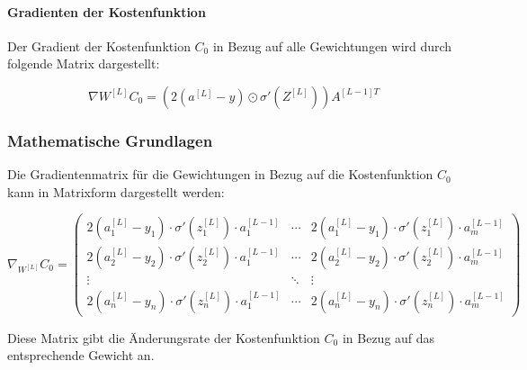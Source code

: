 \paragraph{Gradienten der Kostenfunktion}

Der Gradient der Kostenfunktion \( C_0 \) in Bezug auf alle Gewichtungen wird durch folgende Matrix dargestellt:

\[
\nabla W^{[L]} C_0 = \left( 2 \left( a^{[L]} - y \right) \odot \sigma' \left( Z^{[L]} \right) \right) A^{[L-1]T}
\]

\subsubsection{Mathematische Grundlagen}

Die Gradientenmatrix für die Gewichtungen in Bezug auf die Kostenfunktion \( C_0 \) kann in Matrixform dargestellt werden:

\[
\nabla_{W^{[L]}} C_0 = 
\begin{pmatrix}
2(a_1^{[L]} - y_1) \cdot \sigma' (z_1^{[L]}) \cdot a_1^{[L-1]} & \cdots & 2(a_1^{[L]} - y_1) \cdot \sigma' (z_1^{[L]}) \cdot a_m^{[L-1]} \\
2(a_2^{[L]} - y_2) \cdot \sigma' (z_2^{[L]}) \cdot a_1^{[L-1]} & \cdots & 2(a_2^{[L]} - y_2) \cdot \sigma' (z_2^{[L]}) \cdot a_m^{[L-1]} \\
\vdots & \ddots & \vdots \\
2(a_n^{[L]} - y_n) \cdot \sigma' (z_n^{[L]}) \cdot a_1^{[L-1]} & \cdots & 2(a_n^{[L]} - y_n) \cdot \sigma' (z_n^{[L]}) \cdot a_m^{[L-1]}
\end{pmatrix}
\]

Diese Matrix gibt die Änderungsrate der Kostenfunktion \( C_0 \) in Bezug auf das entsprechende Gewicht an.



